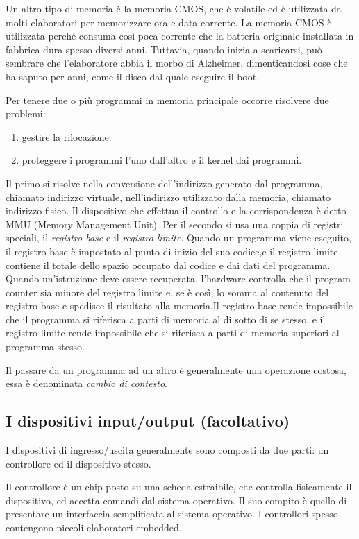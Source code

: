 Un altro tipo di memoria è la memoria CMOS, che è volatile ed è utilizzata da molti elaboratori per memorizzare ora e data corrente.
La memoria CMOS è utilizzata perché consuma così poca corrente che la batteria originale installata in fabbrica dura spesso diversi anni. Tuttavia, quando inizia a scaricarsi, può sembrare che l'elaboratore abbia il morbo di Alzheimer, dimenticandosi cose che ha saputo per anni, come il disco dal quale eseguire il boot.

Per tenere due o più programmi in memoria principale occorre risolvere due problemi: 
\begin{enumerate}
    \item gestire la rilocazione.
    \item proteggere i programmi l'uno dall'altro e il kernel dai programmi.
\end{enumerate}
%
Il primo si risolve nella conversione dell'indirizzo generato dal programma, chiamato indirizzo virtuale, nell'indirizzo utilizzato dalla memoria, chiamato indirizzo fisico. Il dispositivo che effettua il controllo e la corrispondenza è detto MMU (Memory Management Unit).
%
Per il secondo si usa una coppia di registri speciali, il \textit{registro base} e il \textit{registro limite}. Quando un programma viene eseguito, il registro base è impostato al punto di inizio del suo codice,e il registro limite contiene il totale dello spazio occupato dal codice e dai dati del programma. Quando un'istruzione deve essere recuperata, l'hardware controlla che il program counter sia minore del registro limite e, se è così, lo somma al contenuto del registro base e spedisce il risultato alla memoria.Il registro base rende impossibile che il programma si riferisca a parti di memoria al di sotto di se stesso, e il registro limite rende impossibile che si riferisca a parti di memoria superiori al programma stesso.

Il passare da un programma ad un altro è generalmente una operazione costosa, essa è denominata \textit{cambio di contesto}.

\subsection{I dispositivi input/output (facoltativo)}

I dispositivi di ingresso/uscita generalmente sono composti da due parti: un controllore ed il dispositivo stesso.

Il controllore è un chip posto su una scheda estraibile, che controlla fisicamente il dispositivo, ed accetta comandi dal sistema operativo. Il suo compito è quello di presentare un interfaccia semplificata al sistema operativo. I controllori spesso contengono piccoli elaboratori embedded.

